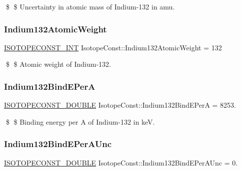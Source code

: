 \$ \$ Uncertainty in atomic mass of Indium-\/132 in amu. \mbox{\label{group___isotope_const-_indium-_in132_ga20b588483e841151db25c1fba4668f09}} 
\subsubsection{\texorpdfstring{Indium132\+Atomic\+Weight}{Indium132AtomicWeight}}
{\footnotesize\ttfamily \mbox{\hyperlink{group___isotope_const-_macros_ga5f18360b3e99483a35c32d789e62621c}{I\+S\+O\+T\+O\+P\+E\+C\+O\+N\+S\+T\+\_\+\+I\+NT}} Isotope\+Const\+::\+Indium132\+Atomic\+Weight = 132}

\$ \$ Atomic weight of Indium-\/132. \mbox{\label{group___isotope_const-_indium-_in132_gaf137818ee51601c13b51f37e17a9eec8}} 
\subsubsection{\texorpdfstring{Indium132\+Bind\+E\+PerA}{Indium132BindEPerA}}
{\footnotesize\ttfamily \mbox{\hyperlink{group___isotope_const-_macros_ga8f45a7272ce02c0b4c65c44636ed719a}{I\+S\+O\+T\+O\+P\+E\+C\+O\+N\+S\+T\+\_\+\+D\+O\+U\+B\+LE}} Isotope\+Const\+::\+Indium132\+Bind\+E\+PerA = 8253.}

\$ \$ Binding energy per A of Indium-\/132 in keV. \mbox{\label{group___isotope_const-_indium-_in132_ga67096ec20ec0446ab7980383da7309bf}} 
\subsubsection{\texorpdfstring{Indium132\+Bind\+E\+Per\+A\+Unc}{Indium132BindEPerAUnc}}
{\footnotesize\ttfamily \mbox{\hyperlink{group___isotope_const-_macros_ga8f45a7272ce02c0b4c65c44636ed719a}{I\+S\+O\+T\+O\+P\+E\+C\+O\+N\+S\+T\+\_\+\+D\+O\+U\+B\+LE}} Isotope\+Const\+::\+Indium132\+Bind\+E\+Per\+A\+Unc = 0.}

